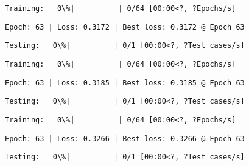 \documentclass[11pt]{article}
\begin{document}
    
    
    \begin{Verbatim}[commandchars=\\\{\}]
Training:   0\%|          | 0/64 [00:00<?, ?Epochs/s]
    \end{Verbatim}

    
    \begin{Verbatim}[commandchars=\\\{\}]
Epoch: 63 | Loss: 0.3172 | Best loss: 0.3172 @ Epoch 63
    \end{Verbatim}

    
    \begin{Verbatim}[commandchars=\\\{\}]
Testing:   0\%|          | 0/1 [00:00<?, ?Test cases/s]
    \end{Verbatim}

    
    
    \begin{Verbatim}[commandchars=\\\{\}]
Training:   0\%|          | 0/64 [00:00<?, ?Epochs/s]
    \end{Verbatim}

    
    \begin{Verbatim}[commandchars=\\\{\}]
Epoch: 63 | Loss: 0.3185 | Best loss: 0.3185 @ Epoch 63
    \end{Verbatim}

    
    \begin{Verbatim}[commandchars=\\\{\}]
Testing:   0\%|          | 0/1 [00:00<?, ?Test cases/s]
    \end{Verbatim}

    
    
    \begin{Verbatim}[commandchars=\\\{\}]
Training:   0\%|          | 0/64 [00:00<?, ?Epochs/s]
    \end{Verbatim}

    
    \begin{Verbatim}[commandchars=\\\{\}]
Epoch: 63 | Loss: 0.3266 | Best loss: 0.3266 @ Epoch 63
    \end{Verbatim}

    
    \begin{Verbatim}[commandchars=\\\{\}]
Testing:   0\%|          | 0/1 [00:00<?, ?Test cases/s]
    \end{Verbatim}
\end{document}
